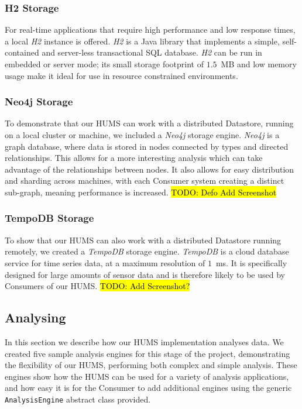 \documentclass[10pt,a4paper]{article}
\begin{document}
\subsubsection{H2 Storage}
For real-time applications that require high performance and low response times, a local \emph{H2} instance is offered. \emph{H2} is a Java library that implements a simple, self-contained and server-less transactional SQL database. \emph{H2} can be run in embedded or server mode; its small storage footprint of $1.5$~MB and low memory usage make it ideal for use in resource constrained environments. 

\subsubsection{Neo4j Storage}
To demonstrate that our HUMS can work with a distributed Datastore, running on a local cluster or machine, we included a \emph{Neo4j} storage engine. \emph{Neo4j} is a graph database, where data is stored in nodes connected by types and directed relationships. This allows for a more interesting analysis which can take advantage of the relationships between nodes. It also allows for easy distribution and sharding across machines, with each Consumer system creating a distinct sub-graph, meaning performance is increased.
\hl{TODO: Defo Add Screenshot}

\subsubsection{TempoDB Storage}
To show that our HUMS can also work with a distributed Datastore running remotely, we created a \emph{TempoDB} storage engine. \emph{TempoDB} is a cloud database service for time series data, at a maximum resolution of $1$~ms. It is specifically designed for large amounts of sensor data and is therefore likely to be used by Consumers of our HUMS.  
\hl{TODO: Add Screenshot?}

\subsection{Analysing}
\label{sec:analysis}
In this section we describe how our HUMS implementation analyses data. We created five sample analysis engines for this stage of the project, demonstrating the flexibility of our HUMS, performing both complex and simple analysis. These engines show how the HUMS can be used for a variety of analysis applications, and how easy it is for the Consumer to add additional engines using the generic \texttt{AnalysisEngine} abstract class provided.
\end{document}
